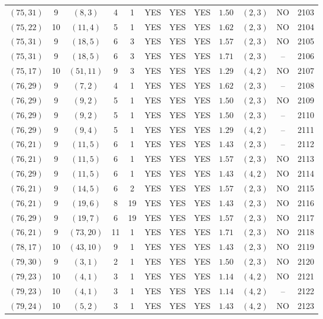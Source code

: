 \begin{longtable}{|c|c|c|c|c|c|c|c|c|c|c|c|}
$(75,31)$ & 9 & $(8,3)$ & 4 & 1 & YES & YES & YES & $1.50$ & $(2,3)$ & NO & 2103\\
$(75,22)$ & 10 & $(11,4)$ & 5 & 1 & YES & YES & YES & $1.62$ & $(2,3)$ & NO & 2104\\
$(75,31)$ & 9 & $(18,5)$ & 6 & 3 & YES & YES & YES & $1.57$ & $(2,3)$ & NO & 2105\\
$(75,31)$ & 9 & $(18,5)$ & 6 & 3 & YES & YES & YES & $1.71$ & $(2,3)$ & -- & 2106\\
$(75,17)$ & 10 & $(51,11)$ & 9 & 3 & YES & YES & YES & $1.29$ & $(4,2)$ & NO & 2107\\
$(76,29)$ & 9 & $(7,2)$ & 4 & 1 & YES & YES & YES & $1.62$ & $(2,3)$ & -- & 2108\\
$(76,29)$ & 9 & $(9,2)$ & 5 & 1 & YES & YES & YES & $1.50$ & $(2,3)$ & NO & 2109\\
$(76,29)$ & 9 & $(9,2)$ & 5 & 1 & YES & YES & YES & $1.50$ & $(2,3)$ & -- & 2110\\
$(76,29)$ & 9 & $(9,4)$ & 5 & 1 & YES & YES & YES & $1.29$ & $(4,2)$ & -- & 2111\\
$(76,21)$ & 9 & $(11,5)$ & 6 & 1 & YES & YES & YES & $1.43$ & $(2,3)$ & -- & 2112\\
$(76,21)$ & 9 & $(11,5)$ & 6 & 1 & YES & YES & YES & $1.57$ & $(2,3)$ & NO & 2113\\
$(76,29)$ & 9 & $(11,5)$ & 6 & 1 & YES & YES & YES & $1.43$ & $(4,2)$ & NO & 2114\\
$(76,21)$ & 9 & $(14,5)$ & 6 & 2 & YES & YES & YES & $1.57$ & $(2,3)$ & NO & 2115\\
$(76,21)$ & 9 & $(19,6)$ & 8 & 19 & YES & YES & YES & $1.43$ & $(2,3)$ & NO & 2116\\
$(76,29)$ & 9 & $(19,7)$ & 6 & 19 & YES & YES & YES & $1.57$ & $(2,3)$ & NO & 2117\\
$(76,21)$ & 9 & $(73,20)$ & 11 & 1 & YES & YES & YES & $1.71$ & $(2,3)$ & NO & 2118\\
$(78,17)$ & 10 & $(43,10)$ & 9 & 1 & YES & YES & YES & $1.43$ & $(2,3)$ & NO & 2119\\
$(79,30)$ & 9 & $(3,1)$ & 2 & 1 & YES & YES & YES & $1.50$ & $(2,3)$ & NO & 2120\\
$(79,23)$ & 10 & $(4,1)$ & 3 & 1 & YES & YES & YES & $1.14$ & $(4,2)$ & NO & 2121\\
$(79,23)$ & 10 & $(4,1)$ & 3 & 1 & YES & YES & YES & $1.14$ & $(4,2)$ & -- & 2122\\
$(79,24)$ & 10 & $(5,2)$ & 3 & 1 & YES & YES & YES & $1.43$ & $(4,2)$ & NO & 2123\\

\end{longtable}
